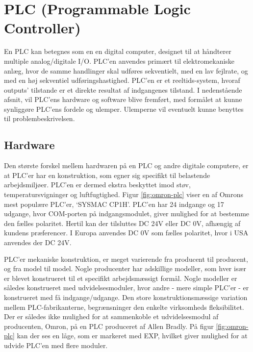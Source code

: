 \section{PLC (Programmable Logic Controller)}
En PLC kan betegnes som en en digital computer, designet til at håndterer multiple analog/digitale I/O. PLC'en anvendes primært til elektromekaniske anlæg, hvor de samme handlinger skal udføres sekventielt, med en lav fejlrate, og med en høj sekventiel udføringshastighed. PLC'en er et reeltids-system, hvoraf outputs' tilstande er et direkte resultat af indgangenes tilstand. I nedenstående afsnit, vil PLC'ens hardware og software blive fremført, med formålet at kunne synliggøre PLC'ens fordele og ulemper. Ulemperne vil eventuelt kunne benyttes til problembeskrivelsen\cite{PLC_hardware_desc}. 

\subsection{Hardware}
Den største forskel mellem hardwaren på en PLC og andre digitale computere, er at PLC'er har en konstruktion, som egner sig specifikt til belastende arbejdsmiljøer. PLC'en er dermed ekstra beskyttet imod støv, temperatursvigninger og luftfugtighed. Figur \ref{fig:omron-plc} viser en af Omrons mest populære PLC'er, \enquote*{SYSMAC CP1H}. PLC'en har 24 indgange og 17 udgange, hvor COM-porten på indgangsmodulet, giver mulighed for at bestemme den fælles polaritet. Hertil kan der tilsluttes DC 24V eller DC 0V, afhængig af kundens præferencer. I Europa anvendes DC 0V som fælles polaritet, hvor i USA anvendes der DC 24V. 


\noindent PLC'er mekaniske konstruktion, er meget varierende fra producent til producent, og fra model til model. Nogle producenter har adskillige modeller, som hver især er blevet konstrueret til et specifikt arbejdsmæssigt formål. Nogle modeller er således konstrueret med udvidelsesmoduler, hvor andre - mere simple PLC'er - er konstrueret med få indgange/udgange. 
Den store konstruktionsmæssige variation mellem PLC-fabrikanterne, begrænsninger den enkelte virksomheds fleksibilitet. Der er således ikke mulighed for at sammenkoble et udvidelsesmodul af producenten, Omron, på en PLC produceret af Allen Bradly\cite{PLC-comb}. På figur \ref{fig:omron-plc} kan der ses en låge, som er markeret med EXP, hvilket giver mulighed for at udvide PLC'en med flere moduler.

